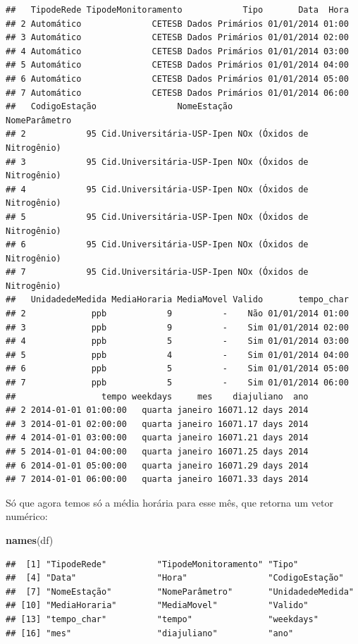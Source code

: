 \documentclass[]{book}
\newenvironment{Shaded}{\begin{snugshade}}{\end{snugshade}}
\newcommand{\KeywordTok}[1]{\textcolor[rgb]{0.13,0.29,0.53}{\textbf{#1}}}
\newcommand{\NormalTok}[1]{#1}
\theoremstyle{definition}
\theoremstyle{definition}
\theoremstyle{definition}
\theoremstyle{remark}
\begin{document}
\begin{verbatim}
##   TipodeRede TipodeMonitoramento            Tipo       Data  Hora
## 2 Automático              CETESB Dados Primários 01/01/2014 01:00
## 3 Automático              CETESB Dados Primários 01/01/2014 02:00
## 4 Automático              CETESB Dados Primários 01/01/2014 03:00
## 5 Automático              CETESB Dados Primários 01/01/2014 04:00
## 6 Automático              CETESB Dados Primários 01/01/2014 05:00
## 7 Automático              CETESB Dados Primários 01/01/2014 06:00
##   CodigoEstação                NomeEstação              NomeParâmetro
## 2            95 Cid.Universitária-USP-Ipen NOx (Óxidos de Nitrogênio)
## 3            95 Cid.Universitária-USP-Ipen NOx (Óxidos de Nitrogênio)
## 4            95 Cid.Universitária-USP-Ipen NOx (Óxidos de Nitrogênio)
## 5            95 Cid.Universitária-USP-Ipen NOx (Óxidos de Nitrogênio)
## 6            95 Cid.Universitária-USP-Ipen NOx (Óxidos de Nitrogênio)
## 7            95 Cid.Universitária-USP-Ipen NOx (Óxidos de Nitrogênio)
##   UnidadedeMedida MediaHoraria MediaMovel Valido       tempo_char
## 2             ppb            9          -    Não 01/01/2014 01:00
## 3             ppb            9          -    Sim 01/01/2014 02:00
## 4             ppb            5          -    Sim 01/01/2014 03:00
## 5             ppb            4          -    Sim 01/01/2014 04:00
## 6             ppb            5          -    Sim 01/01/2014 05:00
## 7             ppb            5          -    Sim 01/01/2014 06:00
##                 tempo weekdays     mes    diajuliano  ano
## 2 2014-01-01 01:00:00   quarta janeiro 16071.12 days 2014
## 3 2014-01-01 02:00:00   quarta janeiro 16071.17 days 2014
## 4 2014-01-01 03:00:00   quarta janeiro 16071.21 days 2014
## 5 2014-01-01 04:00:00   quarta janeiro 16071.25 days 2014
## 6 2014-01-01 05:00:00   quarta janeiro 16071.29 days 2014
## 7 2014-01-01 06:00:00   quarta janeiro 16071.33 days 2014
\end{verbatim}

Só que agora temos só a média horária para esse mês, que retorna um
vetor numérico:

\begin{Shaded}
\begin{Highlighting}[]
\KeywordTok{names}\NormalTok{(df)}
\end{Highlighting}
\end{Shaded}

\begin{verbatim}
##  [1] "TipodeRede"          "TipodeMonitoramento" "Tipo"               
##  [4] "Data"                "Hora"                "CodigoEstação"      
##  [7] "NomeEstação"         "NomeParâmetro"       "UnidadedeMedida"    
## [10] "MediaHoraria"        "MediaMovel"          "Valido"             
## [13] "tempo_char"          "tempo"               "weekdays"           
## [16] "mes"                 "diajuliano"          "ano"
\end{verbatim}
\end{document}

